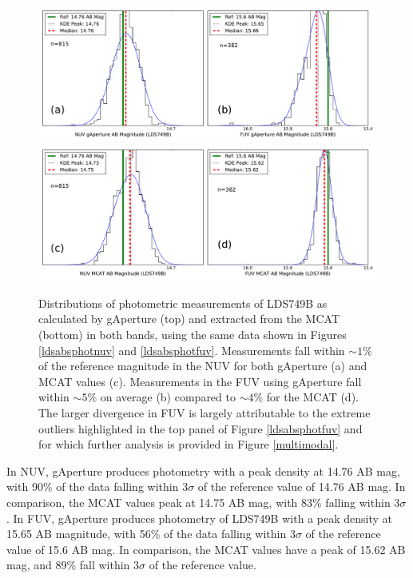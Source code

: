 \documentclass[preprint]{aastex}
\begin{document}
\begin{figure}[h]
\includegraphics[scale=0.45]{Fig08a.pdf}\\
\includegraphics[scale=0.45]{Fig08b.pdf}
\caption{Distributions of photometric measurements of LDS749B as calculated by gAperture (top) and extracted from the MCAT (bottom) in both bands, using the same data shown in Figures \ref{ldsabsphotnuv} and \ref{ldsabsphotfuv}. Measurements fall within $\sim1\%$ of the reference magnitude in the NUV for both gAperture (a) and MCAT values (c). Measurements in the FUV using gAperture fall within $\sim5\%$ on average (b) compared to $\sim4\%$ for the MCAT (d). The larger divergence in FUV is largely attributable to the extreme outliers highlighted in the top panel of Figure \ref{ldsabsphotfuv} and for which further analysis is provided in Figure \ref{multimodal}.
\label{magdist}}
\end{figure}
\clearpage

In NUV, gAperture produces photometry with a peak density at 14.76 AB mag, with 90\% of the data falling within 3$\sigma$ of the reference value of 14.76 AB mag. In comparison, the MCAT values peak at 14.75 AB mag, with 83\% falling within 3$\sigma$. In FUV, gAperture produces photometry of LDS749B with a peak density at 15.65 AB magnitude, with 56\% of the data falling within 3$\sigma$ of the reference value of 15.6 AB mag. In comparison, the MCAT values have a peak of 15.62 AB mag, and 89\% fall within 3$\sigma$ of the reference value.
\end{document}

